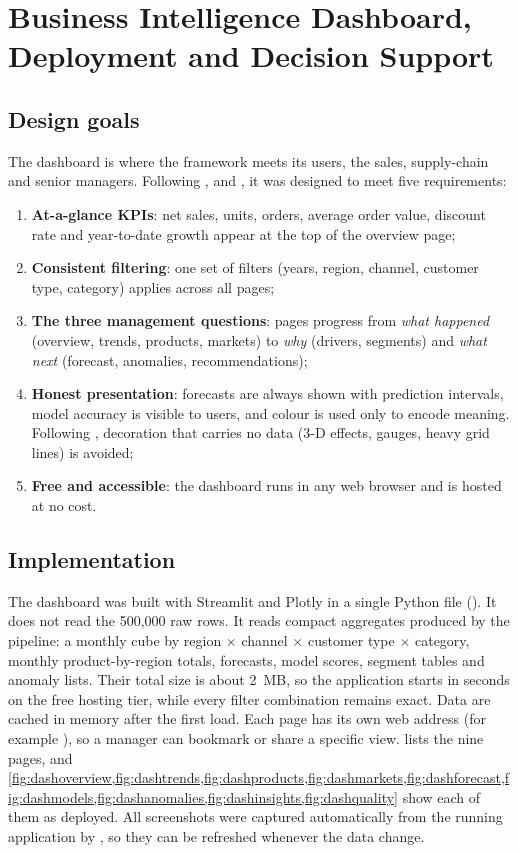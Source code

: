 \chapter[Dashboard, Deployment and Decision Support]{Business Intelligence Dashboard,\\ Deployment and Decision Support}\label{ch:dashboard}

\section{Design goals}
The dashboard is where the framework meets its users, the sales, supply-chain and senior managers. Following
\citet{few2013}, \citet{tufte2001} and \citet{knaflic2015}, it was designed to meet five requirements:
\begin{enumerate}
  \item \textbf{At-a-glance KPIs}: net sales, units, orders, average order value, discount rate and
        year-to-date growth appear at the top of the overview page;
  \item \textbf{Consistent filtering}: one set of filters (years, region, channel, customer type, category)
        applies across all pages;
  \item \textbf{The three management questions}: pages progress from \emph{what happened} (overview, trends,
        products, markets) to \emph{why} (drivers, segments) and \emph{what next} (forecast, anomalies,
        recommendations);
  \item \textbf{Honest presentation}: forecasts are always shown with prediction intervals, model accuracy is
        visible to users, and colour is used only to encode meaning. Following \citet{tufte2001}, decoration
        that carries no data (3-D effects, gauges, heavy grid lines) is avoided;
  \item \textbf{Free and accessible}: the dashboard runs in any web browser and is hosted at no cost.
\end{enumerate}

\section{Implementation}
The dashboard was built with Streamlit and Plotly in a single Python file (). It does
not read the 500,000 raw rows. It reads compact aggregates produced by the pipeline: a monthly cube by region
$\times$ channel $\times$ customer type $\times$ category, monthly product-by-region totals, forecasts, model
scores, segment tables and anomaly lists. Their total size is about 2~MB, so the application starts in seconds
on the free hosting tier, while every filter combination remains exact. Data are cached in memory after the
first load. Each page has its own web address (for example ), so a manager can bookmark
or share a specific view.  lists the nine pages, and
\cref{fig:dashoverview,fig:dashtrends,fig:dashproducts,fig:dashmarkets,fig:dashforecast,fig:dashmodels,fig:dashanomalies,fig:dashinsights,fig:dashquality}
show each of them as deployed. All screenshots were captured automatically from the running application by
, so they can be refreshed whenever the data change.


